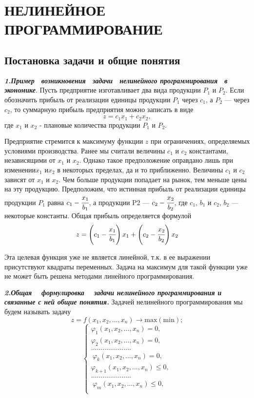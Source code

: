 \section{НЕЛИНЕЙНОЕ ПРОГРАММИРОВАНИЕ}
\subsection{Постановка задачи и общие понятия}
\indent\indent\textbf{\textit{1.Пример~ возникновения~ задачи~ нелинейного программирования~ в~ экономике}}. Пусть предприятие изготавливает два вида продукции \(P_1\) и \(P_2\). Если обозначить прибыль от реализации единицы продукции \(P_1\) через \(c_1\), а \(P_2\) — через \(c_2\), то суммарную прибыль предприятия можно записать в виде
   \[z = c_1x_1+c_2x_2, \]
где \(x_1\) и \(x_2\) - плановые количества продукции \(P_1\) и \(P_2\).

Предприятие стремится к максимуму функции \(z\) при ограничениях, определяемых условиями производства. Ранее  мы считали величины \(c_1\) и \(c_2\) константами, независящими от \(x_1\)  и \(x_2\). Однако такое предположение оправдано лишь при изменении\(x_1\)  и\(x_2\) в  некоторых пределах, да и то приближенно. Величины \(c_1\) и \(c_2\) зависят от \(x_1\)  и \(x_2\). Чем больше продукции попадает на рынок, тем меньше цены на эту продукцию. Предположим, что истинная прибыль от реализации единицы продукции \(P_1\) равна  $c_1-\cfrac{x_1}{b_1}$, а продукции P2 — $c_2-\cfrac{x_2}{b_2}$, где \(c_1\), \(b_1\) и \(c_2\), \(b_2\) —некоторые константы. Общая прибыль определяется формулой $$z=\left(c_1-\cfrac{x_1}{b_1}\right)x_1+\left( c_2-\cfrac{x_2}{b_2}\right)x_2$$

Эта целевая функция уже не является линейной, т.к. в ее выражении присутствуют квадраты переменных. Задача на максимум для такой функции уже не может быть решена методами линейного программирования.

\textbf{\textit{2.Общая ~ формулировка ~ задачи нелинейного программирования и связанные с ней общие понятия.}} Задачей нелинейного программирования мы будем называть задачу
\[z=f(x_1,x_2,\dots,x_n)\to\mathrm{max(min)};\]
\[
    \begin{cases}
        \varphi_1(x_1,x_2,\dots,x_n)=0 ,\\
        \varphi_2(x_1,x_2,\dots,x_n)=0,\\
        \dots\dots\dots\dots\dots\dots\dots\\\
        \varphi_k(x_1,x_2,\dots,x_n)=0,\\
        \varphi_{k+1}(x_1,x_2,\dots,x_n)\leq 0,\\
        \dots\dots\dots\dots\dots\dots\dots\\\
         \varphi_m(x_1,x_2,\dots,x_n)\leq0,\\
    \end{cases}
\]

